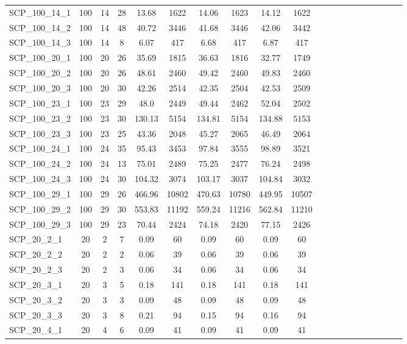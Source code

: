 \begin{sidewaystable}[!ht]
{\begin{tabular}{lccccccccccccccccccc}
SCP\_100\_14\_1 & 100 & 14 & 28 & 13.68 & 1622 & 14.06 & 1623 & 14.12 & 1622 \\
SCP\_100\_14\_2 & 100 & 14 & 48 & 40.72 & 3446 & 41.68 & 3446 & 42.06 & 3442 \\
SCP\_100\_14\_3 & 100 & 14 & 8 & 6.07 & 417 & 6.68 & 417 & 6.87 & 417 \\
SCP\_100\_20\_1 & 100 & 20 & 26 & 35.69 & 1815 & 36.63 & 1816 & 32.77 & 1749 \\
SCP\_100\_20\_2 & 100 & 20 & 26 & 48.61 & 2460 & 49.42 & 2460 & 49.83 & 2460 \\
SCP\_100\_20\_3 & 100 & 20 & 30 & 42.26 & 2514 & 42.35 & 2504 & 42.53 & 2509 \\
SCP\_100\_23\_1 & 100 & 23 & 29 & 48.0 & 2449 & 49.44 & 2462 & 52.04 & 2502 \\
SCP\_100\_23\_2 & 100 & 23 & 30 & 130.13 & 5154 & 134.81 & 5154 & 134.88 & 5153 \\
SCP\_100\_23\_3 & 100 & 23 & 25 & 43.36 & 2048 & 45.27 & 2065 & 46.49 & 2064 \\
SCP\_100\_24\_1 & 100 & 24 & 35 & 95.43 & 3453 & 97.84 & 3555 & 98.89 & 3521 \\
SCP\_100\_24\_2 & 100 & 24 & 13 & 75.01 & 2489 & 75.25 & 2477 & 76.24 & 2498 \\
SCP\_100\_24\_3 & 100 & 24 & 30 & 104.32 & 3074 & 103.17 & 3037 & 104.84 & 3032 \\
SCP\_100\_29\_1 & 100 & 29 & 26 & 466.96 & 10802 & 470.63 & 10780 & 449.95 & 10507 \\
SCP\_100\_29\_2 & 100 & 29 & 30 & 553.83 & 11192 & 559.24 & 11216 & 562.84 & 11210 \\
SCP\_100\_29\_3 & 100 & 29 & 23 &  \textcolor{blue2}{70.44} & 2424 & 74.18 & 2420 & 77.15 & 2426 \\
SCP\_20\_2\_1 & 20 & 2 & 7 & 0.09 & 60 & 0.09 & 60 & 0.09 & 60 \\
SCP\_20\_2\_2 & 20 & 2 & 2 &  \textcolor{blue2}{0.06} & 39 &  \textcolor{blue2}{0.06} & 39 &  \textcolor{blue2}{0.06} & 39 \\
SCP\_20\_2\_3 & 20 & 2 & 3 & 0.06 & 34 & 0.06 & 34 & 0.06 & 34 \\
SCP\_20\_3\_1 & 20 & 3 & 5 &  \textcolor{blue2}{0.18} & 141 &  \textcolor{blue2}{0.18} & 141 &  \textcolor{blue2}{0.18} & 141 \\
SCP\_20\_3\_2 & 20 & 3 & 3 & 0.09 & 48 & 0.09 & 48 & 0.09 & 48 \\
SCP\_20\_3\_3 & 20 & 3 & 8 & 0.21 & 94 & 0.15 & 94 & 0.16 & 94 \\
SCP\_20\_4\_1 & 20 & 4 & 6 & 0.09 & 41 & 0.09 & 41 & 0.09 & 41 \\

\end{tabular}}
\end{sidewaystable}
